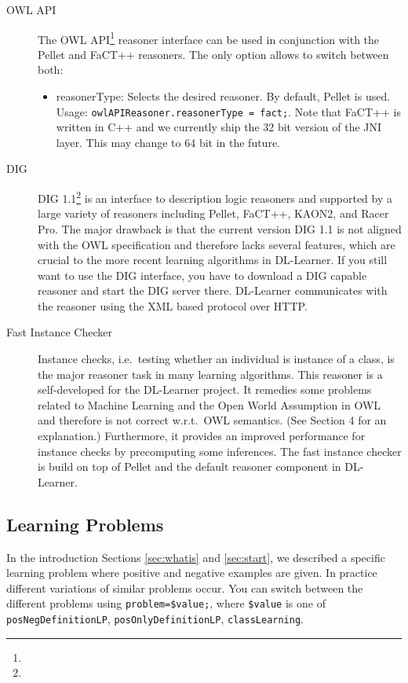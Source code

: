 \documentclass[a4paper,12pt]{scrartcl}
\begin{document}
\begin{description}
 \item[OWL API] The OWL API\footnote{\owlapi} reasoner interface can be used in conjunction with the Pellet and FaCT++ reasoners. The only option allows to switch between both:
 \begin{itemize}
  \item reasonerType: Selects the desired reasoner. By default, Pellet is used. Usage: \verb|owlAPIReasoner.reasonerType = fact;|. Note that FaCT++ is written in C++ and we currently ship the 32 bit version of the JNI layer. This may change to 64 bit in the future.
 \end{itemize}
 \item[DIG] DIG 1.1\footnote{\dig} is an interface to description logic reasoners and supported by a large variety of reasoners including Pellet, FaCT++, KAON2, and Racer Pro. The major drawback is that the current version DIG 1.1 is not aligned with the OWL specification and therefore lacks several features, which are crucial to the more recent learning algorithms in DL-Learner. If you still want to use the DIG interface, you have to download a DIG capable reasoner and start the DIG server there. DL-Learner communicates with the reasoner using the XML based protocol over HTTP.
 \item[Fast Instance Checker] Instance checks, i.e.~testing whether an individual is instance of a class, is the major reasoner task in many learning algorithms. This reasoner is a self-developed for the DL-Learner project. It remedies some problems related to Machine Learning and the Open World Assumption in OWL and therefore is not correct w.r.t.~OWL semantics. (See \cite{cheng00} Section 4 for an explanation.) Furthermore, it provides an improved performance for instance checks by precomputing some inferences. The fast instance checker is build on top of Pellet and the default reasoner component in DL-Learner.
\end{description}

\subsection{Learning Problems}

In the introduction Sections \ref{sec:whatis} and \ref{sec:start}, we described a specific learning problem where positive and negative examples are given. In practice different variations of similar problems occur. You can switch between the different problems using \verb|problem=$value;|, where \verb|$value| is one of \verb|posNegDefinitionLP|, \verb|posOnlyDefinitionLP|, \verb|classLearning|.
\end{document}

